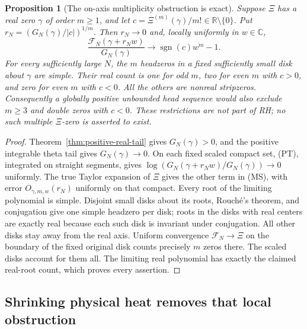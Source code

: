\documentclass[11pt]{article}
\newtheorem{proposition}[theorem]{Proposition}
\theoremstyle{remark}\newtheorem{remark}[theorem]{Remark}
\newcommand{\R}{\mathbb R}
\newcommand{\C}{\mathbb C}
\begin{document}
\begin{proposition}[The on-axis multiplicity obstruction is exact]
\label{prop:head-multiplicity}
Suppose $\Xi$ has a real zero $\gamma$ of order $m\ge1$, and
let $c=\Xi^{(m)}(\gamma)/m!\in\R\setminus\{0\}$.
Put $r_N=(G_N(\gamma)/|c|)^{1/m}$.
Then $r_N\to0$ and, locally uniformly in $w\in\C$,
\[
 \frac{\mathcal F_N(\gamma+r_Nw)}{G_N(\gamma)}
                  \longrightarrow \operatorname{sgn}(c)w^m-1. \tag{MS}
\]
For every sufficiently large $N$, the $m$ headzeros in a fixed
sufficiently small disk about $\gamma$ are simple. Their real count is
one for odd $m$, two for even $m$ with $c>0$, and zero for even $m$
with $c<0$. All the others are nonreal stripzeros.
Consequently a globally positive unbounded head sequence would also
exclude $m\ge3$ and double zeros with $c<0$. These restrictions are
not part of RH; no such multiple $\Xi$-zero is asserted to exist.
\end{proposition}
\begin{proof}
Theorem~\ref{thm:positive-real-tail} gives $G_N(\gamma)>0$,
and the positive integrable theta tail gives $G_N(\gamma)\to0$.
On each fixed scaled compact set, (PT), integrated on straight segments,
gives
$\log(G_N(\gamma+r_Nw)/G_N(\gamma))\to0$ uniformly.
The true Taylor expansion of $\Xi$ gives the other term in (MS),
with error $O_{\gamma,m,w}(r_N)$ uniformly on that compact.
Every root of the limiting polynomial is simple.
Disjoint small disks about its roots, Rouch\'e's theorem, and conjugation
give one simple headzero per disk; roots in the disks with real centers
are exactly real because each such disk is invariant under conjugation.
All other disks stay away from the real axis.
Uniform convergence $\mathcal F_N\to\Xi$ on the boundary of the fixed
original disk counts precisely $m$ zeros there.
The scaled disks account for them all.
The limiting real polynomial has exactly the claimed real-root count,
which proves every assertion.
\end{proof}

\subsection{Shrinking physical heat removes that local obstruction}
\end{document}
